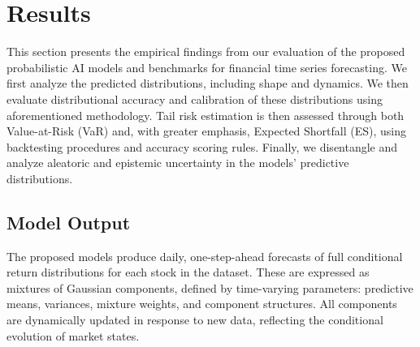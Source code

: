 \section{Results} 
\label{sec:6_results}
This section presents the empirical findings from our evaluation of the proposed probabilistic AI models and benchmarks for financial time series forecasting. We first analyze the predicted distributions, including shape and dynamics. 
We then evaluate distributional accuracy and calibration of these distributions using aforementioned methodology. Tail risk estimation is then assessed through both Value-at-Risk (VaR) and, with greater emphasis, Expected Shortfall (ES), using backtesting procedures and accuracy scoring rules. Finally, we disentangle and analyze aleatoric and epistemic uncertainty in the models' predictive distributions.
\subsection{Model Output}
\label{sec:results_model_output}

The proposed models produce daily, one-step-ahead forecasts of full conditional return distributions for each stock in the dataset. 
These are expressed as mixtures of Gaussian components, defined by time-varying parameters: predictive means, variances, mixture weights, and component structures. All components are dynamically updated in response to new data, reflecting the conditional evolution of market states.

